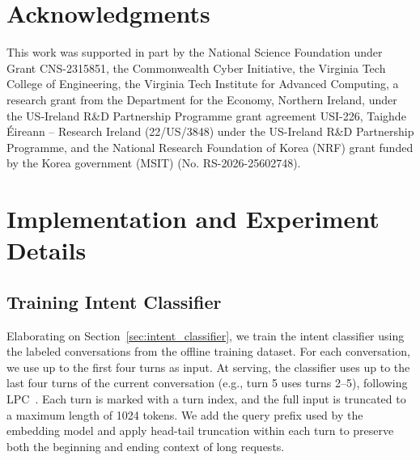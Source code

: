 \documentclass{article}
\begin{document}
\vspace{-5pt}

\section*{Acknowledgments}

\vspace{-10pt}

This work was supported in part by the National Science Foundation under Grant CNS-2315851, the Commonwealth Cyber Initiative, the Virginia Tech College of Engineering, the Virginia Tech Institute for Advanced Computing, a research grant from the Department for the Economy, Northern Ireland, under the US-Ireland R\&D Partnership Programme grant agreement USI-226, Taighde Éireann – Research Ireland (22/US/3848) under the US-Ireland R\&D Partnership Programme, 
and the National Research Foundation of Korea (NRF) grant funded by the Korea government (MSIT) (No. RS-2026-25602748).





\newpage
\appendix

\section{Implementation and Experiment Details}




\subsection{Training Intent Classifier}
\label{app:intent_classifier_training}

Elaborating on Section~\ref{sec:intent_classifier}, we train the intent classifier using the labeled conversations from the offline training dataset. For each conversation, we use up to the first four turns as input. At serving, the classifier uses up to the last four turns of the current conversation (e.g., turn 5 uses turns 2--5), following LPC~\cite{yanglearned}. Each turn is marked with a turn index, and the full input is truncated to a maximum length of 1024 tokens. We add the query prefix used by the embedding model and apply head-tail truncation within each turn to preserve both the beginning and ending context of long requests.
\end{document}
